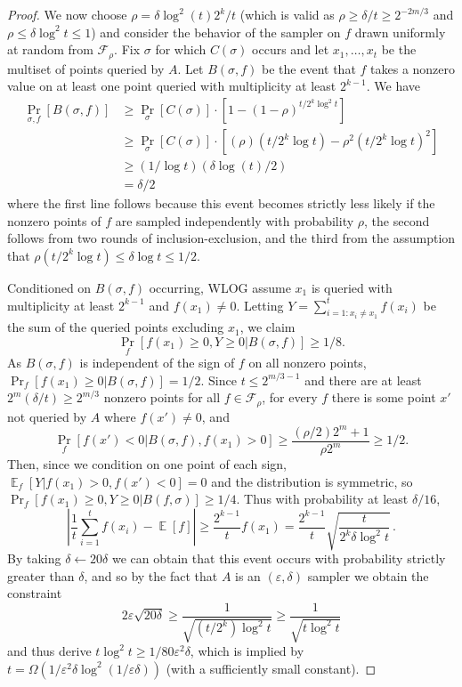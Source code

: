 \documentclass[11pt]{article}
\numberwithin{equation}{section}
\theoremstyle{definition}
\theoremstyle{plain}
\newcommand{\eps}{\varepsilon}
\newcommand{\la}{\leftarrow}
\newcommand{\cF}{\mathcal{F}}
\DeclareMathOperator*{\E}{\mathbb{E}}
\begin{document}
\begin{proof}
We now choose $\rho=\delta\log^2(t)2^k/t$ (which is valid as $\rho\geq \delta/t\geq 2^{-2m/3}$ and $\rho\leq \delta\log^2 t\leq 1$) and consider the behavior of the sampler on $f$ drawn uniformly at random from $\cF_\rho$. Fix $\sigma$ for which $C(\sigma)$ occurs and let $x_1,\ldots,x_t$ be the multiset of points queried by $A$. Let $B(\sigma,f)$ be the event that $f$ takes a nonzero value on at least one point queried with multiplicity at least $2^{k-1}$. We have
\begin{align*}
    \Pr_{\sigma,f}[B(\sigma,f)] &\geq \Pr_\sigma[C(\sigma)]\cdot \left[1-(1-\rho)^{t/2^k\log^2 t}\right]\\
    &\geq \Pr_\sigma[C(\sigma)]\cdot\left[(\rho)(t/2^k\log t)-\rho^2(t/2^k\log t)^2\right]\\
    &\geq (1/\log t)(\delta \log(t)/2)\\
    &= \delta/2%
\end{align*}
%
where %
the first line follows because this event becomes strictly less likely if the nonzero points of $f$ are sampled independently with probability $\rho$, the second follows from two rounds of inclusion-exclusion, and the third from the assumption that $\rho(t/2^k\log t)\leq \delta\log t\leq 1/2$. 

Conditioned on $B(\sigma,f)$ occurring, WLOG assume $x_1$ is queried with multiplicity at least $2^{k-1}$ and $f(x_1)\neq 0$. 
Letting $Y=\sum_{i=1:x_i\neq x_1}^tf(x_i)$ be the sum of the queried points excluding $x_1$, we claim
\[\Pr_{f}[f(x_1)\geq 0,Y\geq 0|B(\sigma,f)]\geq 1/8.\]
As $B(\sigma,f)$ is independent of the sign of $f$ on all nonzero points, $\Pr_f[f(x_1)\geq 0|B(\sigma,f)]=1/2$. Since $t \leq 2^{m/3-1}$ and there are at least $2^m(\delta/t)\geq 2^{m/3}$ nonzero points for all $f\in \cF_\rho$, for every $f$ there is some point $x'$ not queried by $A$ where $f(x')\neq 0$, and
\[\Pr_f[f(x')<0|B(\sigma,f),f(x_1)>0]\geq \frac{(\rho/2)2^m+1}{\rho 2^m}\geq 1/2.\]
Then, %
since we condition on one point of each sign, $\E_{f}[Y|f(x_1)>0,f(x')<0]=0$ and the distribution is symmetric, so $\Pr_{f}[f(x_1)\geq 0,Y\geq 0|B(f,\sigma)]\geq 1/4$. Thus with probability at least $\delta/16$,
\[\left|\frac{1}{t}\sum_{i=1}^tf(x_i)-\E[f]\right|\geq \frac{2^{k-1}}{t}f(x_1)=  \frac{2^{k-1}}{t}\sqrt{\frac{t}{2^k\delta\log^2t}}\,. \]  %
By taking $\delta\la 20\delta$ we can obtain that this event occurs with probability strictly greater than $\delta$, and so by the fact that $A$ is an $(\eps,\delta)$ sampler we obtain the constraint
\[2\eps\sqrt{20\delta} \geq \frac{1}{\sqrt{(t/2^k)\log^2t}} \geq \frac{1}{\sqrt{t\log^2 t}}\]
and thus derive $t\log^2 t\geq 1/80\eps^2\delta$, which is implied by $t=\Omega(1/\eps^2\delta\log^2(1/\eps\delta))$ (with a sufficiently small constant).
\end{proof}
\end{document}

